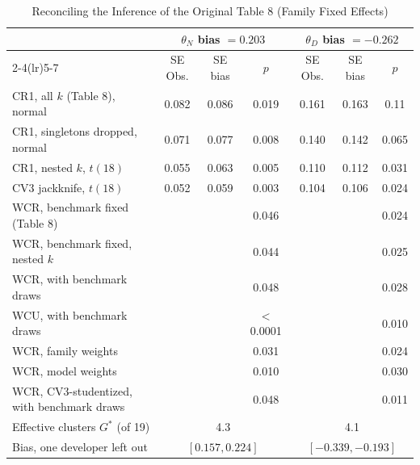 \begin{table}[tp]
\centering
\caption{Reconciling the Inference of the Original Table 8 (Family Fixed Effects)}
\label{tab:app-inference}
\footnotesize
\setlength{\tabcolsep}{3pt}
\begin{tabular}{@{}l ccc ccc@{}}
\toprule
 & \multicolumn{3}{c}{$\theta_N$ bias $=0.203$} & \multicolumn{3}{c}{$\theta_D$ bias $=-0.262$} \\
\cmidrule(lr){2-4}\cmidrule(lr){5-7}
 & SE Obs. & SE bias & $p$ & SE Obs. & SE bias & $p$ \\
\midrule
CR1, all $k$ (Table 8), normal & 0.082 & 0.086 & 0.019 & 0.161 & 0.163 & 0.11 \\
CR1, singletons dropped, normal & 0.071 & 0.077 & 0.008 & 0.140 & 0.142 & 0.065 \\
CR1, nested $k$, $t(18)$ & 0.055 & 0.063 & 0.005 & 0.110 & 0.112 & 0.031 \\
CV3 jackknife, $t(18)$ & 0.052 & 0.059 & 0.003 & 0.104 & 0.106 & 0.024 \\
\addlinespace[2pt]
WCR, benchmark fixed (Table 8) &  &  & 0.046 &  &  & 0.024 \\
WCR, benchmark fixed, nested $k$ &  &  & 0.044 &  &  & 0.025 \\
WCR, with benchmark draws &  &  & 0.048 &  &  & 0.028 \\
WCU, with benchmark draws &  &  & $<$0.0001 &  &  & 0.010 \\
WCR, family weights &  &  & 0.031 &  &  & 0.024 \\
WCR, model weights &  &  & 0.010 &  &  & 0.030 \\
WCR, CV3-studentized, with benchmark draws &  &  & 0.048 &  &  & 0.011 \\
\addlinespace[2pt]
Effective clusters $G^*$ (of 19) & \multicolumn{3}{c}{4.3} & \multicolumn{3}{c}{4.1} \\
Bias, one developer left out & \multicolumn{3}{c}{$[0.157,0.224]$} & \multicolumn{3}{c}{$[-0.339,-0.193]$} \\
\bottomrule
\end{tabular}


\end{table}
